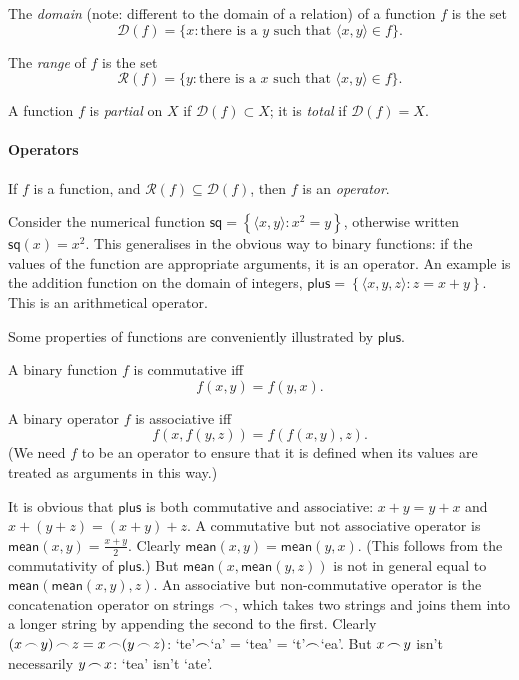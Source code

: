 \begin{definition}[Domain]
The \emph{domain} (note: different to the domain of a relation) of a function  $f$ is the set $$\mathcal{D}(f)=\{x: \text{there is a $y$ such that } \langle x,y \rangle \in f\}.$$
\end{definition}
\begin{definition}[Range]
	The \emph{range} of $f$ is the set $$\mathcal{R}(f)=\{y: \text{there is a $x$ such that } \langle x,y \rangle \in f\}.$$
\end{definition}

\begin{definition}
	A function
$f$ is \emph{partial}  on $X$ if $\mathcal{D}(f) \subset X$; it is \emph{total} if $\mathcal{D}(f) =X$.
\end{definition}

\paragraph{Operators}

\begin{definition}[Operator]
	If $f$ is a function, and $\mathcal{R}(f) \subseteq \mathcal{D}(f)$, then $f$ is an \emph{operator}.
\end{definition}
Consider the numerical function $\mathsf{sq} = \left\{\langle x,y\rangle: x^{2} = y\right\}$, otherwise written $\mathsf{sq}(x) = x^2$. This generalises in the obvious way to binary functions: if the values of the function are appropriate arguments, it is an operator. An example is the addition function on the domain of integers, $\mathsf{plus} = \left\{\langle x, y, z\rangle : z = x + y\right\}$. This is an arithmetical operator.

Some properties of functions are conveniently illustrated by $\mathsf{plus}$.
\begin{definition}[Commutative]
	A binary function $f$ is commutative iff $$f(x,y) = f(y,x).$$  
\end{definition}
\begin{definition}[Associative]
	A binary operator $f$ is associative iff $$f(x,f(y,z)) = f(f(x,y),z).$$ (We need $f$ to be an operator to ensure that it is defined when its values are treated as arguments in this way.)
\end{definition}
It is obvious that $\mathsf{plus}$ is both commutative and associative: $x+y=y+x$ and $x+(y+z)=(x+y)+z$. A commutative but not associative operator is $\mathsf{mean}(x,y) = \tfrac{x+y}{2}$. Clearly $\mathsf{mean}(x,y)=\mathsf{mean}(y,x)$. (This follows from the commutativity of $\mathsf{plus}$.) But $\mathsf{mean}(x,\mathsf{mean}(y,z))$ is not in general equal to $\mathsf{mean}(\mathsf{mean}(x,y),z)$. An associative but non-commutative operator is the concatenation operator on strings $\mathop{\frown}$, which takes two strings and joins them into a longer string by appending the second to the first. Clearly $(x\mathop{\frown} y)\mathop{\frown} z = x \mathop{\frown} (y\mathop{\frown} z)$: `te'$\mathop{\frown}$`a' = `tea' = `t'$\mathop{\frown}$`ea'. But $x\mathop{\frown} y$ isn't necessarily $y\mathop{\frown} x$: `tea' isn't `ate'.



